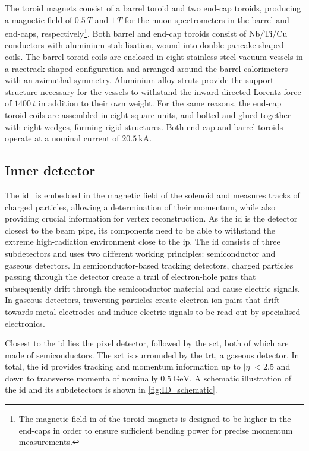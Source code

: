 The toroid magnets consist of a barrel toroid and two end-cap toroids, producing a magnetic field of $\SI{0.5}{T}$ and $\SI{1}{T}$ for the muon spectrometers in the barrel and end-caps, respectively\footnote{The magnetic field in of the toroid magnets is designed to be higher in the end-caps in order to ensure sufficient bending power for precise momentum measurements.}.
Both barrel and end-cap toroids consist of Nb/Ti/Cu conductors with aluminium stabilisation, wound into double pancake-shaped coils.
The barrel toroid coils are enclosed in eight stainless-steel vacuum vessels in a racetrack-shaped configuration and arranged around the barrel calorimeters with an azimuthal symmetry.
Aluminium-alloy struts provide the support structure necessary for the vessels to withstand the inward-directed Lorentz force of $\SI{1400}{t}$ in addition to their own weight.
For the same reasons, the end-cap toroid coils are assembled in eight square units, and bolted and glued together with eight wedges, forming rigid structures.
Both end-cap and barrel toroids operate at a nominal current of $\SI{20.5}{\kilo\ampere}$.

\subsection{Inner detector}

The \gls{id}~\cite{Aad:2008zzm} is embedded in the magnetic field of the solenoid and measures tracks of charged particles, allowing a determination of their momentum, while also providing crucial information for vertex reconstruction. As the \gls{id} is the detector closest to the beam pipe, its components need to be able to withstand the extreme high-radiation environment close to the \gls{ip}. The \gls{id} consists of three subdetectors and uses two different working principles: semiconductor and gaseous detectors. In semiconductor-based tracking detectors, charged particles passing through the detector create a trail of electron-hole pairs that subsequently drift through the semiconductor material and cause electric signals. In gaseous detectors, traversing particles create electron-ion pairs that drift towards metal electrodes and induce electric signals to be read out by specialised electronics.

 Closest to the \gls{id} lies the pixel detector, followed by the \gls{sct}, both of which are made of semiconductors. The \gls{sct} is surrounded by the \gls{trt}, a gaseous detector. In total, the \gls{id} provides tracking and momentum information up to $\vert\eta\vert < 2.5$ and down to transverse momenta of nominally $\SI{0.5}{\GeV}$. A schematic illustration of the \gls{id} and its subdetectors is shown in \cref{fig:ID_schematic}. 

